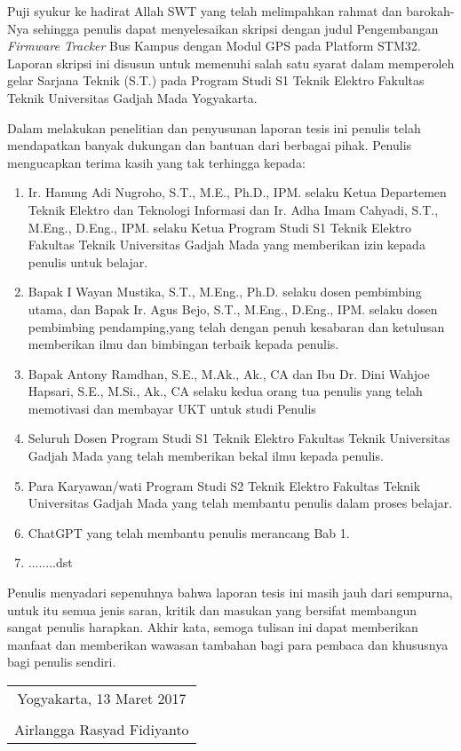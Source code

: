 Puji syukur ke hadirat Allah SWT yang telah melimpahkan rahmat dan barokah-Nya sehingga penulis dapat menyelesaikan skripsi dengan judul Pengembangan \textit{Firmware Tracker} Bus Kampus dengan Modul GPS pada Platform STM32. Laporan skripsi ini disusun untuk memenuhi salah satu syarat dalam memperoleh gelar Sarjana Teknik (S.T.) pada Program Studi S1 Teknik Elektro Fakultas Teknik Universitas Gadjah Mada Yogyakarta.


Dalam melakukan penelitian dan penyusunan laporan tesis ini penulis telah mendapatkan banyak dukungan dan bantuan dari berbagai pihak. Penulis mengucapkan terima kasih yang tak terhingga kepada:

\begin{enumerate}
	\item Ir. Hanung Adi Nugroho, S.T., M.E., Ph.D., IPM. selaku Ketua Departemen Teknik Elektro dan Teknologi Informasi dan Ir. Adha Imam Cahyadi, S.T., M.Eng., D.Eng., IPM. selaku Ketua Program Studi S1 Teknik Elektro Fakultas Teknik Universitas Gadjah Mada yang memberikan izin kepada penulis untuk belajar.
		
	\item Bapak I Wayan Mustika, S.T., M.Eng., Ph.D. selaku dosen pembimbing utama, dan Bapak Ir. Agus Bejo, S.T., M.Eng., D.Eng., IPM. selaku dosen pembimbing pendamping,yang telah dengan penuh kesabaran dan ketulusan memberikan ilmu dan bimbingan terbaik kepada penulis.
	
	\item Bapak Antony Ramdhan, S.E., M.Ak., Ak., CA dan Ibu Dr. Dini Wahjoe Hapsari, S.E., M.Si., Ak., CA selaku kedua orang tua penulis yang telah memotivasi dan membayar UKT untuk studi Penulis
	
	\item Seluruh Dosen Program Studi S1 Teknik Elektro Fakultas Teknik Universitas Gadjah Mada yang telah memberikan bekal ilmu kepada penulis.
	
	\item Para Karyawan/wati Program Studi S2 Teknik Elektro Fakultas Teknik Universitas Gadjah Mada yang telah membantu penulis dalam proses belajar.
	
	\item ChatGPT yang telah membantu penulis merancang Bab 1.
	
	\item ........dst

\end{enumerate}

Penulis menyadari sepenuhnya bahwa laporan tesis ini masih jauh dari sempurna, untuk itu semua jenis saran, kritik dan masukan yang bersifat membangun sangat penulis harapkan. Akhir kata, semoga tulisan ini dapat memberikan manfaat dan memberikan wawasan tambahan bagi para pembaca dan khususnya bagi penulis sendiri.

\begin{flushright}
	\begin{tabular}{c}
		Yogyakarta, 13 Maret 2017 \\
		\vspace{1cm} \\
		Airlangga Rasyad Fidiyanto
	\end{tabular}
\end{flushright}